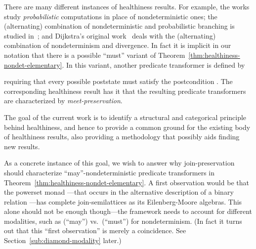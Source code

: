 \documentclass[9pt, preprint]{sigplanconf}
\theoremstyle{theorem}
\theoremstyle{definition}
\begin{document}
There are many different instances of healthiness results.  For example,
the works~\cite{Kozen81,Jones90PhD} study \emph{probabilistic}
computations in place of nondeterministic ones; the (alternating)
combination of nondeterministic and probabilistic branching is studied
in~\cite{MorganMS96}; and Dijkstra's original work~\cite{Dijkstra76}
deals with the (alternating) combination of nondeterminism and
divergence. In fact it is implicit in our notation 
that there is a possible ``must'' variant of
Theorem~\ref{thm:healthiness-nondet-elementary}. In this
variant, another  predicate transformer  is defined by

requiring that every possible poststate must satisfy the postcondition
.  The corresponding healthiness result has it that the resulting predicate
transformers are characterized by \emph{meet-preservation}.


The goal of the current work is to identify a structural and categorical
principle behind  healthiness, and hence to provide a common
ground for the  existing body of healthiness results, also providing a methodology that possibly aids finding
new  results.

 As a concrete instance of this goal, we wish to answer why
join-preservation should characterize ``may''-nondeterministic predicate
transformers  in
Theorem~\ref{thm:healthiness-nondet-elementary}. A first observation
would be that the powerset monad ---that occurs in the alternative
description  of a binary relation ---has
complete join-semilattices as its Eilenberg-Moore algebras.  This alone
should not be enough though---the framework needs to account for
different modalities, such as  (``may'') vs.\ 
(``must'') for nondeterminism. (In fact it turns out that this ``first
observation'' is merely a coincidence. See
Section~\ref{sub:diamond-modality} later.)
\end{document}
